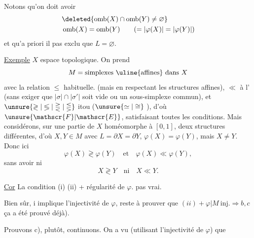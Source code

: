 
Notons qu'on  doit avoir
\[
\begin{aligned}
&\deleted{\operatorname{omb}(X)\cap\operatorname{omb}(Y)\ne\varnothing}\\
&\operatorname{omb}(X)=\operatorname{omb}(Y)\qquad (=|\varphi(X)|=|\varphi(Y)|)
\end{aligned}
\]
et qu'a priori il  pas exclu que $L=\varnothing$.

\uline{Exemple} $X$ espace topologique. On prend 
\[
M=\text{simplexes \uline{affines} dans }X
\]
avec la relation $\leq$ habituelle.  (mais en respectant les structures affines), $\ll$ à l' (sans exiger que $|\sigma|\cap|\sigma'|$ soit vide ou un sous-simplexe commun), et $\unsure{\gtrless|\lessgtr|\gtreqless|\lesseqgtr}$ itou ($\unsure{\simeq|\cong}$ ), d'où $\unsure{\mathscr{F}|\mathscr{E}}$, satisfaisant toutes les conditions. Mais considérons, sur une partie de $X$ homéomorphe à $[0,1]$, deux structures   différentes, d'où $X,Y\in M$ avec  $L=\partial X=\partial Y$, $\varphi(X)=\varphi(Y)$, mais $X\ne Y$. Donc ici
\[
\varphi(X)\gtrless\varphi(Y)\quad\text{et}\quad\varphi(X)\ll\varphi(Y),
\]
sans avoir ni
\[
X\gtrless Y\quad\text{ni}\quad X\ll Y.
\]


\uline{Cor} La condition (i)   (ii) + régularité de $\varphi$.   pas vrai.

Bien sûr, i implique l'injectivité de $\varphi$, reste à prouver que $(ii)+\varphi|M\ \text{inj.}\Rightarrow b,c$ \unsure{(}ça a été prouvé déjà).

Prouvons c), plutôt, continuons. On a vu (utilisant l'injectivité de $\varphi$) que
